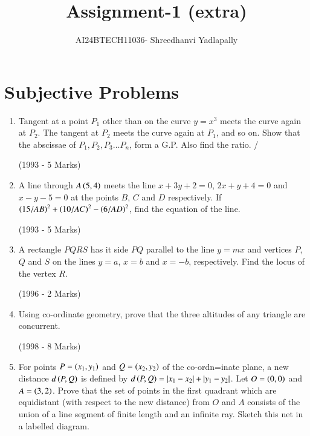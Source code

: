 \documentclass[journal,12pt,twocolumn]{IEEEtran}
\theoremstyle{remark}
\begin{document}
\renewcommand{\thefigure}{\theenumi}
\renewcommand{\thetable}{\theenumi}

\vspace{3cm}

\title{Assignment-1 (extra) }
\author{AI24BTECH11036- Shreedhanvi Yadlapally}
\maketitle
\newpage
\bigskip
\section{Subjective Problems}
\begin{enumerate}

\item Tangent at a point $P_{1}$ {other than } on the curve $y=x^{3}$ meets the curve again at $P_{2}$. The tangent at $P_{2}$ meets the curve again at $P_{1}$, and so on. Show that the abscissae of $P_{1}, P_{2}, P_{3} \dots P_{n}$, form a G.P. Also find the ratio. /

	\hfill{(1993 - 5 Marks)}

\item A line through $A \left(5, 4\right)$ meets the line $x+3y+2=0$, $2x+y+4=0$ and $x-y-5=0$ at the points $B$, $C$ and $D$ respectively. If $\left(15/AB\right)^{2}+\left(10/AC\right)^{2}-\left(6/AD\right)^{2}$, find the equation of the line.

	\hfill{(1993 - 5 Marks)}

\item A rectangle $PQRS$ has it side $PQ$ parallel to the line $y=mx$ 
and vertices $P$, $Q$ and $S$ on the lines $y=a$, $x=b$ and $x=-b$, 
respectively. Find the locus of the vertex $R$.
	
		\hfill{(1996 - 2 Marks)}

\item Using co-ordinate geometry, prove that the three altitudes of any triangle are concurrent.

	\hfill{(1998 - 8 Marks)}

\item For points $P=\left(x_{1}, y_{1}\right)$ and $Q=\left(x_{2}, y_{2}\right)$ of the co-ordn=inate plane, a new distance $d\left(P, Q\right)$ is defined by $d\left(P, Q\right)=\left\vert x_{1}-x_{2}\right\vert+\left\vert y_{1}-y_{2}\right\vert$. Let $O=\left(0, 0\right)$ and $A=\left(3, 2\right)$. Prove that the set of points in the first quadrant which are equidistant (with respect to the new distance) from $O$ and $A$ consists of the union of a line segment of finite length and an infinite ray. Sketch this net in a labelled diagram.


\end{enumerate}
\end{document}

